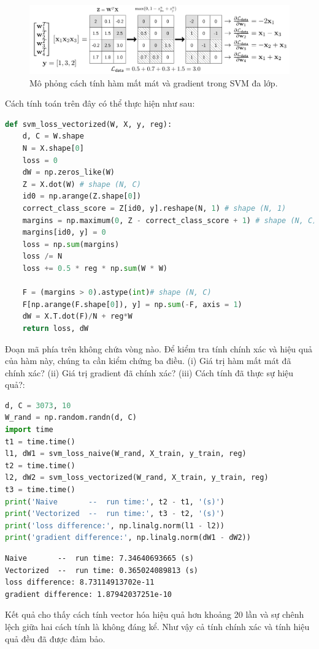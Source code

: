 \begin{figure}[t]
    \centering
        \includegraphics[width = \textwidth]{Chapters/09_SupportVectorMachines/22_multiclasssvm/latex/vectorized_loss_gray.pdf}
        \caption[]{Mô phỏng cách tính hàm mất mát và gradient trong SVM đa lớp.} \label{fig:22_7}
    \end{figure}
    
Cách tính toán trên đây có thể thực hiện như sau:

\begin{lstlisting}[language=Python]
def svm_loss_vectorized(W, X, y, reg):
    d, C = W.shape 
    N = X.shape[0]
    loss = 0 
    dW = np.zeros_like(W)
    Z = X.dot(W) # shape (N, C)
    id0 = np.arange(Z.shape[0])
    correct_class_score = Z[id0, y].reshape(N, 1) # shape (N, 1)
    margins = np.maximum(0, Z - correct_class_score + 1) # shape (N, C)
    margins[id0, y] = 0
    loss = np.sum(margins)
    loss /= N 
    loss += 0.5 * reg * np.sum(W * W)
    
    F = (margins > 0).astype(int)# shape (N, C)
    F[np.arange(F.shape[0]), y] = np.sum(-F, axis = 1)
    dW = X.T.dot(F)/N + reg*W
    return loss, dW 
\end{lstlisting}

Đoạn mã phía trên không chứa vòng  nào. Để kiểm tra tính
chính xác và hiệu quả của hàm này, chúng ta cần kiểm chứng ba điều. (i) Giá trị
hàm mất mát đã chính xác? (ii) Giá trị gradient đã chính xác? (iii)
Cách tính đã thực sự hiệu quả?:
\begin{lstlisting}[language=Python]
d, C = 3073, 10
W_rand = np.random.randn(d, C)
import time 
t1 = time.time()
l1, dW1 = svm_loss_naive(W_rand, X_train, y_train, reg)
t2 = time.time()
l2, dW2 = svm_loss_vectorized(W_rand, X_train, y_train, reg)
t3 = time.time()
print('Naive       --  run time:', t2 - t1, '(s)')
print('Vectorized  --  run time:', t3 - t2, '(s)')
print('loss difference:', np.linalg.norm(l1 - l2))
print('gradient difference:', np.linalg.norm(dW1 - dW2))
\end{lstlisting}
\kq
\begin{lstlisting}
Naive       --  run time: 7.34640693665 (s)
Vectorized  --  run time: 0.365024089813 (s)
loss difference: 8.73114913702e-11
gradient difference: 1.87942037251e-10
\end{lstlisting}
Kết quả cho thấy cách tính vector hóa hiệu quả hơn khoảng 20 lần và sự chênh lệch giữa hai cách tính là không đáng kể.
 Như vậy cả tính chính xác và tính hiệu quả đều đã được đảm bảo. 

